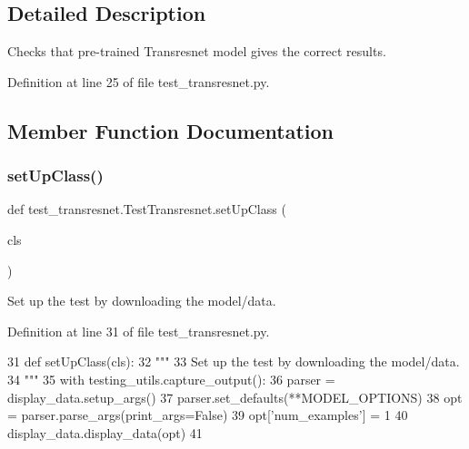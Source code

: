 \subsection{Detailed Description}
\begin{DoxyVerb}Checks that pre-trained Transresnet model gives the correct results.
\end{DoxyVerb}
 

Definition at line 25 of file test\+\_\+transresnet.\+py.



\subsection{Member Function Documentation}
\mbox{\label{classtest__transresnet_1_1TestTransresnet_aafc17231f7444de8b09ff767920e8f85}} 
\subsubsection{\texorpdfstring{set\+Up\+Class()}{setUpClass()}}
{\footnotesize\ttfamily def test\+\_\+transresnet.\+Test\+Transresnet.\+set\+Up\+Class (\begin{DoxyParamCaption}\item[{}]{cls }\end{DoxyParamCaption})}

\begin{DoxyVerb}Set up the test by downloading the model/data.
\end{DoxyVerb}
 

Definition at line 31 of file test\+\_\+transresnet.\+py.


\begin{DoxyCode}
31     \textcolor{keyword}{def }setUpClass(cls):
32         \textcolor{stringliteral}{"""}
33 \textcolor{stringliteral}{        Set up the test by downloading the model/data.}
34 \textcolor{stringliteral}{        """}
35         with testing\_utils.capture\_output():
36             parser = display\_data.setup\_args()
37             parser.set\_defaults(**MODEL\_OPTIONS)
38             opt = parser.parse\_args(print\_args=\textcolor{keyword}{False})
39             opt[\textcolor{stringliteral}{'num\_examples'}] = 1
40             display\_data.display\_data(opt)
41 
\end{DoxyCode}
\mbox{\label{classtest__transresnet_1_1TestTransresnet_a6e1645b6a63146c1757aed9057b44d5e}} 
